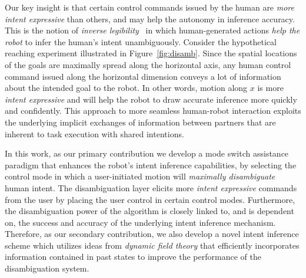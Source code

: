 Our key insight is that certain control commands issued by the human are \textit{more intent expressive} than others, and may help the autonomy in inference accuracy. This is the notion of \textit{inverse legibility}~\citep{gopinath2017mode} in which human-generated actions \textit{help the robot} to infer the human's intent unambiguously. Consider the hypothetical reaching experiment illustrated in Figure~\ref{fig:disamb}. Since the spatial locations of the goals are maximally spread along the horizontal axis, any human control command issued along the horizontal dimension conveys a lot of information about the intended goal to the robot. In other words, motion along $x$ is more \textit{intent expressive} and will help the robot to draw accurate inference more quickly and confidently. This approach to more seamless human-robot interaction exploits the underlying implicit exchanges of information between partners that are inherent to task execution with shared intentions. 

In this work, as our primary contribution we develop a mode switch assistance paradigm that enhances the robot's intent inference capabilities, by selecting the control mode in which a user-initiated motion will \textit{maximally disambiguate} human intent. The disambiguation layer elicits more \textit{intent expressive} commands from the user by placing the user control in certain control modes. Furthermore, the disambiguation power of the algorithm is closely linked to, and is dependent on, the success and accuracy of the underlying intent inference mechanism. Therefore, as our secondary contribution, we also develop a novel intent inference scheme which utilizes ideas from \textit{dynamic field theory} that efficiently incorporates information contained in past states to improve the performance of the disambiguation system. 

